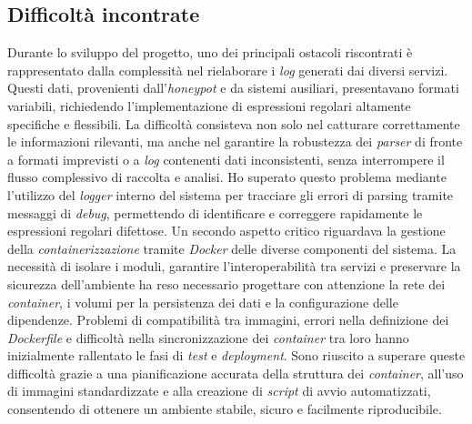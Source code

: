 \subsection{Difficoltà incontrate}
Durante lo sviluppo del progetto, uno dei principali ostacoli riscontrati è rappresentato dalla complessità nel rielaborare i \textit{log} generati dai diversi servizi. Questi dati, provenienti dall'\textit{honeypot} e da sistemi ausiliari, presentavano formati variabili, richiedendo l'implementazione di espressioni regolari altamente specifiche e flessibili. La difficoltà consisteva non solo nel catturare correttamente le informazioni rilevanti, ma anche nel garantire la robustezza dei \textit{parser} di fronte a formati imprevisti o a \textit{log} contenenti dati inconsistenti, senza interrompere il flusso complessivo di raccolta e analisi. Ho superato questo problema mediante l'utilizzo del \textit{logger} interno del sistema per tracciare gli errori di parsing tramite messaggi di \textit{debug}, permettendo di identificare e correggere rapidamente le espressioni regolari difettose.
Un secondo aspetto critico riguardava la gestione della \textit{containerizzazione} tramite \textit{Docker} delle diverse componenti del sistema. La necessità di isolare i moduli, garantire l'interoperabilità tra servizi e preservare la sicurezza dell'ambiente ha reso necessario progettare con attenzione la rete dei \textit{container}, i volumi per la persistenza dei dati e la configurazione delle dipendenze. Problemi di compatibilità tra immagini, errori nella definizione dei \textit{Dockerfile} e difficoltà nella sincronizzazione dei \textit{container} tra loro hanno inizialmente rallentato le fasi di \textit{test} e \textit{deployment}. Sono riuscito a superare queste difficoltà grazie a una pianificazione accurata della struttura dei \textit{container}, all'uso di immagini standardizzate e alla creazione di \textit{script} di avvio automatizzati, consentendo di ottenere un ambiente stabile, sicuro e facilmente riproducibile.\\\\
